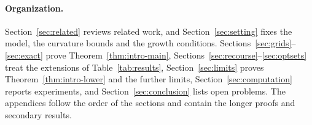 \paragraph{Organization.}
Section~\ref{sec:related} reviews related work, and Section~\ref{sec:setting}
fixes the model, the curvature bounds and the growth conditions.
Sections~\ref{sec:grids}--\ref{sec:exact} prove Theorem~\ref{thm:intro-main},
Sections~\ref{sec:recourse}--\ref{sec:optsets} treat the extensions of
Table~\ref{tab:results}, Section~\ref{sec:limits} proves
Theorem~\ref{thm:intro-lower} and the further limits,
Section~\ref{sec:computation} reports experiments, and
Section~\ref{sec:conclusion} lists open problems. The appendices follow the
order of the sections and contain the longer proofs and secondary results.
